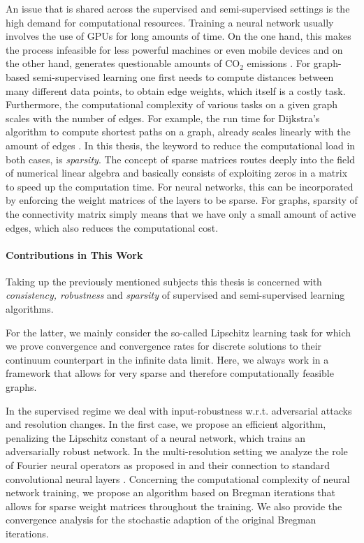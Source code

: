 An issue that is shared across the supervised and semi-supervised settings is the high demand for computational resources. Training a neural network usually involves the use of GPUs for long amounts of time. On the one hand, this makes the process infeasible for less powerful machines or even mobile devices and on the other hand, generates questionable amounts of $\mathrm{CO_2}$ emissions \cite{hoefler2021sparsity}. For graph-based semi-supervised learning one first needs to compute distances between many different data points, to obtain edge weights, which itself is a costly task. Furthermore, the computational complexity of various tasks on a given graph scales with the number of edges. For example, the run time for Dijkstra's algorithm to compute shortest paths on a graph, already scales linearly with the amount of edges \cite{dijkstra2022note}. In this thesis, the keyword to reduce the computational load in both cases, is \textit{sparsity}. The concept of sparse matrices routes deeply into the field of numerical linear algebra \cite{lanczos1952solution,golub2013matrix} and basically consists of exploiting zeros in a matrix to speed up the computation time. For neural networks, this can be incorporated by enforcing the weight matrices of the layers to be sparse. For graphs, sparsity of the connectivity matrix simply means that we have only a small amount of active edges, which also reduces the computational cost.
%
%
\paragraph{Contributions in This Work}
%
Taking up the previously mentioned subjects this thesis is concerned with \textit{consistency, robustness} and \textit{sparsity} of supervised and semi-supervised learning algorithms. 

For the latter, we mainly consider the so-called Lipschitz learning task \cite{nadler2009statistical} for which we prove convergence and convergence rates for discrete solutions to their continuum counterpart in the infinite data limit. Here, we always work in a framework that allows for very sparse and therefore computationally feasible graphs.

In the supervised regime we deal with input-robustness w.r.t. adversarial attacks and resolution changes. In the first case, we propose an efficient algorithm, penalizing the Lipschitz constant \cite{lipschitz1877lehrbuch} of a neural network, which trains an adversarially robust network. In the multi-resolution setting we analyze the role of Fourier neural operators as proposed in \cite{li2020fourier} and their connection to standard convolutional neural layers \cite{fukushima1980neocognitron}. Concerning the computational complexity of neural network training, we propose an algorithm based on Bregman iterations \cite{osher2005iterative} that allows for sparse weight matrices throughout the training. We also provide the convergence analysis for the stochastic adaption of the original Bregman iterations.

